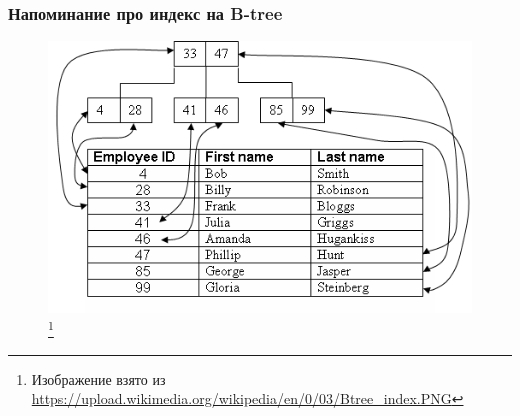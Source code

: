 \documentclass{beamer}
\begin{document}
\begin{frame}
\frametitle{Напоминание про индекс на B-tree}

\begin{figure}[htb]
\includegraphics[width=\textwidth,height=0.8\textheight,keepaspectratio]{btree-index.png} 
\footnote{\tiny{Изображение взято из \url{https://upload.wikimedia.org/wikipedia/en/0/03/Btree\_index.PNG}}}
\end{figure}

\end{frame}
\end{document}
